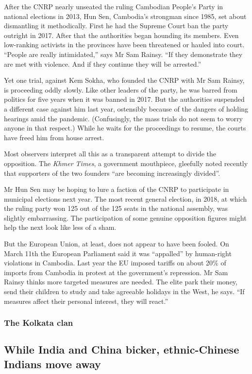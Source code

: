 \documentclass{article}
\begin{document}
After the CNRP nearly unseated the ruling Cambodian People's Party in national elections in 2013, Hun Sen, Cambodia's strongman since 1985, set about dismantling it methodically. First he had the Supreme Court ban the party outright in 2017. After that the authorities began hounding its members. Even low-ranking activists in the provinces have been threatened or hauled into court. ``People are really intimidated,'' says Mr Sam Rainsy. ``If they demonstrate they are met with violence. And if they continue they will be arrested.'' 

Yet one trial, against Kem Sokha, who founded the CNRP with Mr Sam Rainsy, is proceeding oddly slowly. Like other leaders of the party, he was barred from politics for five years when it was banned in 2017. But the authorities suspended a different case against him last year, ostensibly because of the dangers of holding hearings amid the pandemic. (Confusingly, the mass trials do not seem to worry anyone in that respect.) While he waits for the proceedings to resume, the courts have freed him from house arrest. 

Most observers interpret all this as a transparent attempt to divide the opposition. The \emph{Khmer Times}, a government mouthpiece, gleefully noted recently that supporters of the two founders ``are becoming increasingly divided''. 

Mr Hun Sen may be hoping to lure a faction of the CNRP to participate in municipal elections next year. The most recent general election, in 2018, at which the ruling party won 125 out of the 125 seats in the national assembly, was slightly embarrassing. The participation of some genuine opposition figures might help the next look like less of a sham. 

But the European Union, at least, does not appear to have been fooled. On March 11th the European Parliament said it was ``appalled'' by human-right violations in Cambodia. Last year the EU imposed tariffs on about 20\% of imports from Cambodia in protest at the government's repression. Mr Sam Rainsy thinks more targeted measures are needed. The elite park their money, send their children to study and take agreeable holidays in the West, he says. ``If measures affect their personal interest, they will react.'' {} 
\clearpage
\subsubsection{The Kolkata clan }
\subsection{While India and China bicker, ethnic-Chinese Indians move away }
\end{document}
